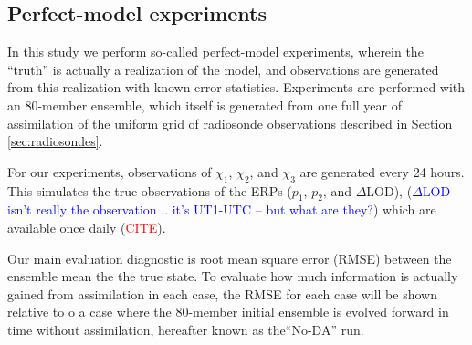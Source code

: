 \documentclass[draft,jgrga]{agutex}
\begin{document}
\begin{article}
\subsection{Perfect-model experiments}
\label{sec:experiments}
In this study we  perform so-called perfect-model experiments, wherein the ``truth'' is actually a realization of the model, and observations are generated from this realization with known error statistics.
Experiments are performed with an 80-member ensemble, which itself is generated from one full year of assimilation of the uniform grid of radiosonde observations described in Section \ref{sec:radiosondes}.

For our experiments, observations of $\chi_1$, $\chi_2$, and $\chi_3$ are generated every 24 hours.
This simulates the true observations of the ERPs ($p_1$, $p_2$, and $\Delta$LOD),
(\textcolor{blue}{$\Delta$LOD isn't really the observation .. it's UT1-UTC -- but what are they?})
which are available once daily (\textcolor{red}{CITE}).


Our main evaluation diagnostic is root mean square error (RMSE) between the ensemble mean the the true state.
To evaluate how much information is actually gained from assimilation in each case, the RMSE for each case will be shown relative to o a case where the 80-member initial ensemble is evolved forward in time without assimilation, hereafter known as the``No-DA'' run.



\end{article}
\end{document}

